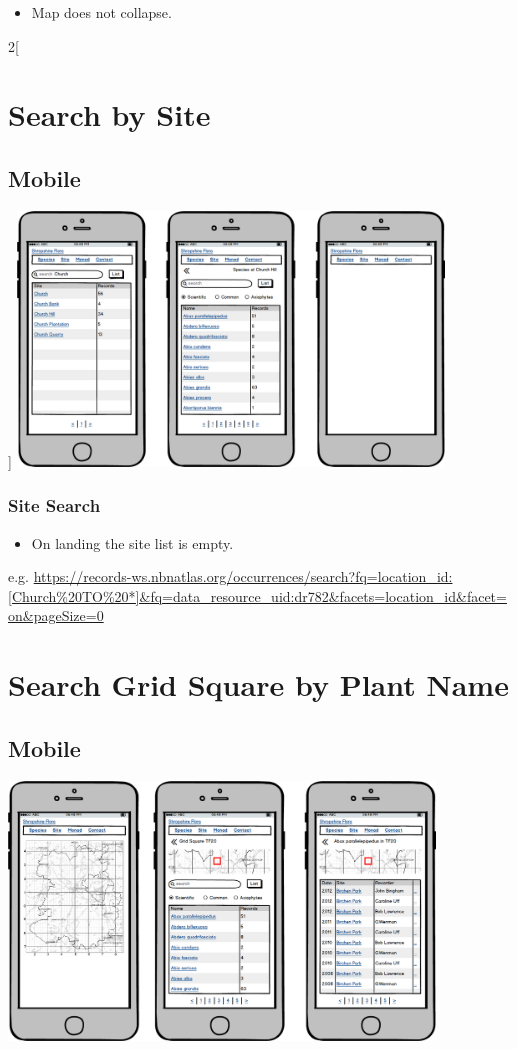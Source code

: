 \documentclass[a4paper,12pt,landscape]{article}
\begin{document}
\begin{itemize}
  \item Map does not collapse.
\end{itemize}
\clearpage

\begin{multicols*}{2}[%
  \section{Search by Site}%
  \subsection{Mobile}%
]
\includegraphics[width=0.85\textwidth]{./wireframes/site-mobile.png}%
\clearpage

\subsubsection{Site Search}

\begin{itemize}
  \item On landing the site list is empty.
\end{itemize}

e.g. \url{https://records-ws.nbnatlas.org/occurrences/search?fq=location_id:[Church%20TO%20*]&fq=data_resource_uid:dr782&facets=location_id&facet=on&pageSize=0}

\end{multicols*}
\clearpage

\section{Search Grid Square by Plant Name}
\subsection{Mobile}
  \includegraphics[width=0.85\textwidth]{./wireframes/monad-mobile.png}
\end{document}
